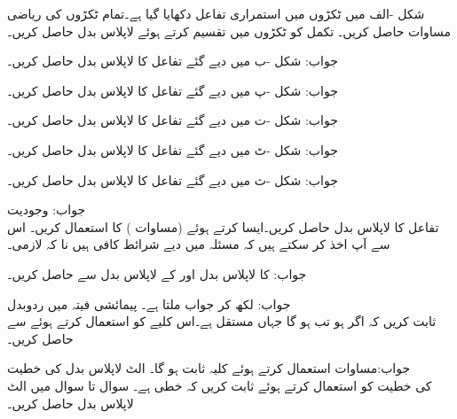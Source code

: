 شکل -الف میں ٹکڑوں میں استمراری تفاعل دکھایا گیا ہے۔تمام ٹکڑوں کی ریاضی مساوات حاصل کریں۔ تکمل   کو ٹکڑوں میں تقسیم کرتے ہوئے لاپلاس بدل حاصل کریں۔

جواب:
شکل -ب میں دیے گئے تفاعل کا لاپلاس بدل حاصل کریں۔

جواب:
شکل -پ میں دیے گئے تفاعل کا لاپلاس بدل حاصل کریں۔

جواب:
شکل -ت میں دیے گئے تفاعل کا لاپلاس بدل حاصل کریں۔

جواب:
شکل -ٹ میں دیے گئے تفاعل کا لاپلاس بدل حاصل کریں۔

جواب:
شکل -ث میں دیے گئے تفاعل کا لاپلاس بدل حاصل کریں۔

جواب:
\quad وجودیت\\
تفاعل  کا لاپلاس بدل حاصل کریں۔ایسا کرتے ہوئے  (مساوات ) کا استعمال کریں۔ اس سے آپ اخذ کر سکتے ہیں کہ مسئلہ  میں دیے شرائط کافی ہیں نا کہ لازمی۔

جواب:
 کا لاپلاس بدل  اور  کے لاپلاس بدل سے حاصل کریں۔

جواب: لکھ کر جواب  ملتا ہے۔
\quad پیمائشی فیتہ میں ردوبدل\\
ثابت کریں کہ اگر   ہو تب  ہو گا جہاں  مستقل ہے۔اس کلیے کو استعمال کرتے ہوئے  سے  حاصل کریں۔

جواب:مساوات  استعمال کرتے ہوئے کلیہ ثابت ہو گا۔
\quad الٹ لاپلاس بدل کی خطیت\\
 کی خطیت کو استعمال کرتے ہوئے ثابت کریں کہ  خطی ہے۔
سوال  تا سوال  میں الٹ لاپلاس بدل حاصل کریں۔


